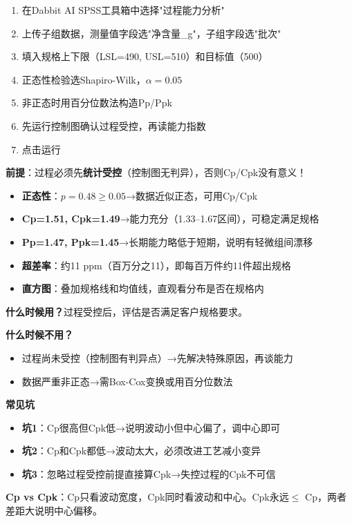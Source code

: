 \begin{algosposs}
\begin{enumerate}
    \item 在Dabbit AI SPSS工具箱中选择"过程能力分析"
    \item 上传子组数据，测量值字段选"净含量\_g"，子组字段选"批次"
    \item 填入规格上下限（LSL=490, USL=510）和目标值（500）
    \item 正态性检验选Shapiro-Wilk，$\alpha=0.05$
    \item 非正态时用百分位数法构造Pp/Ppk
    \item 先运行控制图确认过程受控，再读能力指数
    \item 点击运行
\end{enumerate}

\textbf{前提}：过程必须先\textbf{统计受控}（控制图无判异），否则Cp/Cpk没有意义！
\end{algosposs}

\begin{algoresult}
\begin{itemize}
    \item \textbf{正态性}：$p=0.48 \geq 0.05$→数据近似正态，可用Cp/Cpk
    \item \textbf{Cp=1.51, Cpk=1.49}→能力充分（1.33--1.67区间），可稳定满足规格
    \item \textbf{Pp=1.47, Ppk=1.45}→长期能力略低于短期，说明有轻微组间漂移
    \item \textbf{超差率}：约11 ppm（百万分之11），即每百万件约11件超出规格
    \item \textbf{直方图}：叠加规格线和均值线，直观看分布是否在规格内
\end{itemize}
\end{algoresult}

\begin{algonotes}
\textbf{什么时候用？}过程受控后，评估是否满足客户规格要求。

\textbf{什么时候不用？}
\begin{itemize}
    \item 过程尚未受控（控制图有判异点）→先解决特殊原因，再谈能力
    \item 数据严重非正态→需Box-Cox变换或用百分位数法
\end{itemize}

\textbf{常见坑}
\begin{itemize}
    \item \textbf{坑1}：Cp很高但Cpk低→说明波动小但中心偏了，调中心即可
    \item \textbf{坑2}：Cp和Cpk都低→波动太大，必须改进工艺减小变异
    \item \textbf{坑3}：忽略过程受控前提直接算Cpk→失控过程的Cpk不可信
\end{itemize}

\textbf{Cp vs Cpk}：Cp只看波动宽度，Cpk同时看波动和中心。Cpk永远$\leq$ Cp，两者差距大说明中心偏移。
\end{algonotes}

